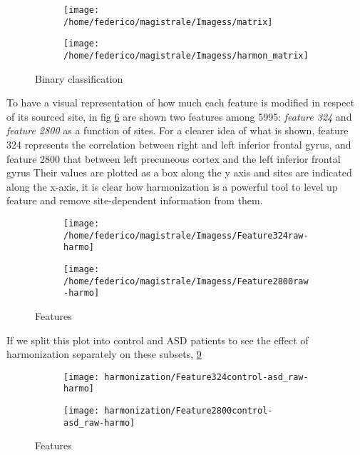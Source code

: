 \documentclass[a4paper,11pt]{article}
\begin{document}
\begin{figure}
\centering
\begin{subfigure}[b]{0.8\textwidth}
   \texttt{[image: /home/federico/magistrale/Imagess/matrix]}
   \caption{}
   \label{fig:heatmap_harmonization_harmon}
\end{subfigure}

\begin{subfigure}[b]{0.8\textwidth}
   \texttt{[image: /home/federico/magistrale/Imagess/harmon\_matrix]}
   \caption{}
   \label{fig:heatmap_harmonization_noharmon}
\end{subfigure}

\caption{Binary classification}
\label{fig:heatmap_harmonization}
\end{figure}

\cite{pomponio}
To have a visual representation of how much each feature is modified in respect of its sourced site, in fig \ref{fig:features_raw-harmo} are shown two features among 5995: \emph{feature 324} and \emph{feature 2800} as a function of sites.
For a clearer idea of what is shown, feature 324 represents the correlation between right and left inferior frontal gyrus, and feature 2800 that between left precuneous cortex and the left inferior frontal gyrus
Their values are plotted as a box along the y axis and sites are indicated along the x-axis, it is clear how harmonization is a powerful tool to level up feature and remove site-dependent information from them.

\begin{figure}
\centering
\begin{subfigure}[b]{1.\textwidth}
   \texttt{[image: /home/federico/magistrale/Imagess/Feature324raw-harmo]}
   \caption{}
   \label{fig:feature324}
\end{subfigure}
\begin{subfigure}[b]{1.\textwidth}
   \texttt{[image: /home/federico/magistrale/Imagess/Feature2800raw-harmo]}
   \caption{}
   \label{fig:feature2800}
\end{subfigure}
\caption{Features}
\label{fig:features_raw-harmo}
\end{figure}

 If we split this plot into control and ASD patients to see the effect of harmonization separately on these subsets, \ref{fig:features_control-asd_raw-harmo}

 \begin{figure}
 \centering
 \begin{subfigure}[b]{1.\textwidth}
    \texttt{[image: harmonization/Feature324control-asd\_raw-harmo]}
    \caption{}
    \label{fig:feature324-control-asd}
 \end{subfigure}
 \begin{subfigure}[b]{1.\textwidth}
    \texttt{[image: harmonization/Feature2800control-asd\_raw-harmo]}
    \caption{}
    \label{fig:feature2800control-asd}
 \end{subfigure}
 \caption{Features}
 \label{fig:features_control-asd_raw-harmo}
 \end{figure}
\end{document}
